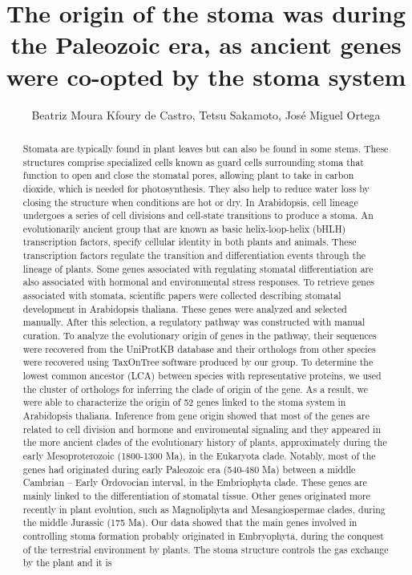 \documentclass[twoside]{article}
\title{\vspace{-15mm}\fontsize{24pt}{10pt}\selectfont\textbf{ The origin of the stoma was during the Paleozoic era,  as ancient genes were co-opted by the stoma system }} %
\author{ Beatriz Moura Kfoury de Castro, Tetsu Sakamoto, Jos\'e Miguel Ortega }
\affil{ Universidade Federal de Minas Gerais }
\date{}
\begin{document}
  
  
  \maketitle %
  
  
  \thispagestyle{fancy} %
  
  
  \begin{abstract}
  Stomata are typically found in plant leaves but can also be found in some stems. These structures comprise specialized cells known as guard cells surrounding stoma that function to open and close the stomatal pores,  allowing plant to take in carbon dioxide,  which is needed for photosynthesis. They also help to reduce water loss by closing the structure when conditions are hot or dry. In Arabidopsis,  cell lineage undergoes a series of cell divisions and cell-state transitions to produce a stoma. An evolutionarily ancient group that are known as basic helix-loop-helix (bHLH) transcription factors,  specify cellular identity in both plants and animals. These transcription factors regulate the transition and differentiation events through the lineage of plants. Some genes associated with regulating stomatal differentiation are also associated with hormonal and environmental stress responses. To retrieve genes associated with stomata,  scientific papers were collected describing stomatal development in Arabidopsis thaliana. These genes were analyzed and selected manually. After this selection,  a regulatory pathway was constructed with manual curation. To analyze the evolutionary origin of genes in the pathway,  their sequences were recovered from the UniProtKB database and their orthologs from other species were recovered using TaxOnTree software produced by our group. To determine the lowest common ancestor (LCA) between species with representative proteins,  we used the cluster of orthologs for inferring the clade of origin of the gene. As a result,  we were able to characterize the origin of 52 genes linked to the stoma system in Arabidopsis thaliana. Inference from gene origin showed that most of the genes are related to cell division and hormone and enviromental signaling and they appeared in the more ancient clades of the evolutionary history of plants,  approximately during the early Mesoproterozoic (1800-1300 Ma),  in the Eukaryota clade. Notably,  most of the genes had originated during early Paleozoic era (540-480 Ma) between a middle Cambrian – Early Ordovocian interval,  in the Embriophyta clade. These genes are mainly linked to the differentiation of stomatal tissue. Other genes originated more recently in plant evolution,  such as Magnoliphyta and Mesangiospermae clades,  during the middle Jurassic (175 Ma). Our data showed that the main genes involved in controlling stoma formation probably originated in Embryophyta,  during the conquest of the terrestrial environment by plants. The stoma structure controls the gas exchange by the plant and it is 
\end{abstract}
\end{document}
